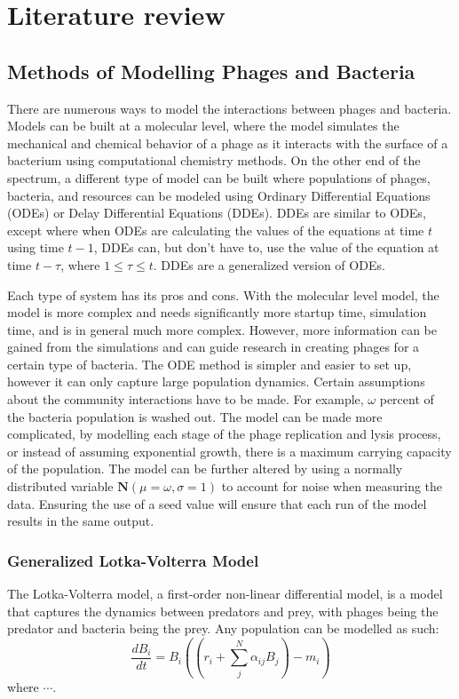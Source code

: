 \chapter{Literature review}
\label{LR}

\section{Methods of Modelling Phages and Bacteria}
There are numerous ways to model the interactions between phages and bacteria.
Models can be built at a molecular level, where the model simulates the mechanical and chemical behavior of a phage as it interacts with the surface of a bacterium using computational chemistry methods.
On the other end of the spectrum, a different type of model can be built where populations of phages, bacteria, and resources can be modeled using Ordinary Differential Equations (ODEs) or Delay Differential Equations (DDEs).
DDEs are similar to ODEs, except where when ODEs are calculating the values of the equations at time $t$ using time $t-1$, DDEs can, but don't have to, use the value of the equation at time $t-\tau$, where $1 \leq \tau \leq t$. 
DDEs are a generalized version of ODEs. \newline 

Each type of system has its pros and cons.
With the molecular level model, the model is more complex and needs significantly more startup time, simulation time, and is in general much more complex.
However, more information can be gained from the simulations and can guide research in creating phages for a certain type of bacteria.
The ODE method is simpler and easier to set up, however it can only capture large population dynamics.
Certain assumptions about the community interactions have to be made.
For example, $\omega$ percent of the bacteria population is washed out.
The model can be made more complicated, by modelling each stage of the phage replication and lysis process, or instead of assuming exponential growth, there is a maximum carrying capacity of the population.
The model can be further altered by using a normally distributed variable $\textbf{N}(\mu=\omega, \sigma=1)$ to account for noise when measuring the data.
Ensuring the use of a seed value will ensure that each run of the model results in the same output. 

\subsection{Generalized Lotka-Volterra Model}
The Lotka-Volterra model, a first-order non-linear differential model, is a model that captures the dynamics between predators and prey, with phages being the predator and bacteria being the prey.
Any population can be modelled as such:
\[ 
    \frac{d{B}_i}{dt} = {B}_i \left(\left(r_i + \sum_{j}^{N} \alpha_{ij}{B}_j \right) - m_i\right)
\]
where $\cdots$.
 
